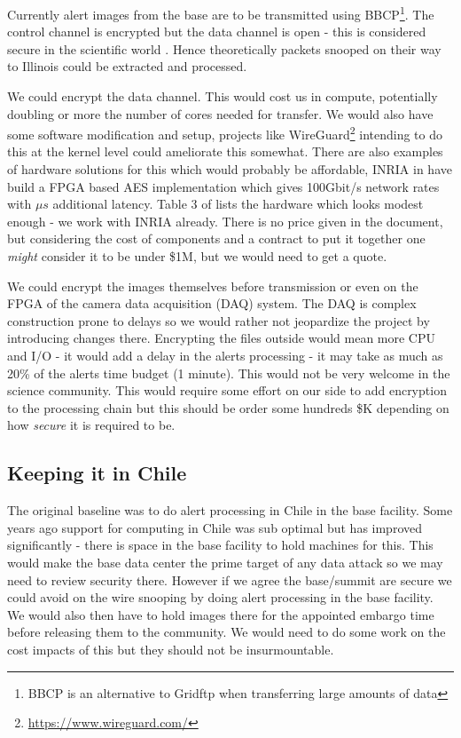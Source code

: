 Currently alert images from the base are to be transmitted using BBCP\footnote{BBCP is an alternative to Gridftp when transferring large amounts of data}. The control channel is encrypted but the data channel is open - this is considered secure in the scientific world \citep{bbcp}. Hence theoretically packets snooped on their way to Illinois could be extracted and processed.


We could encrypt the data  channel. This would cost us in  compute, potentially  doubling or more the number of cores needed for transfer. We would also have some software modification and setup, projects like WireGuard\footnote{\url{https://www.wireguard.com/}} intending to do this at the kernel level could ameliorate this somewhat.
There are also  examples of hardware solutions for this which would probably be affordable, INRIA in \cite{10.1007/978-3-642-45073-0_1} have build a FPGA based AES\cite{aes} implementation  which gives 100Gbit/s network rates with $\mu s$ additional latency. Table 3 of \cite{10.1007/978-3-642-45073-0_1} lists the hardware which looks modest enough - we work with INRIA already. There is no price given in the document, but considering the cost of components and a contract to put it together one \emph{might} consider it to be  under \$1M, but we would need to get a quote.

We could encrypt the images themselves before transmission or even on the FPGA of the camera data acquisition (DAQ) system.  The DAQ is complex construction prone to delays so we would rather not jeopardize the project by introducing changes there. Encrypting the files outside would mean more CPU and I/O - it would add a delay in the alerts processing - it may take as much as 20\% of the alerts time budget (1 minute).  This would not be very welcome in the science community. This would require some effort on our side to add encryption to the processing chain but this should be order some hundreds \$K depending on how \emph{secure} it is required to be.



\subsection{Keeping it in Chile}\label{sec:chile}
The original baseline was to do alert processing in Chile in the base facility. Some years ago support for computing in Chile was sub optimal but has improved significantly - there is space in the base facility to hold machines for this.
This would make the base data center the prime target of any data  attack so we may need to review security there.
However if we agree the base/summit are secure we could avoid on the wire snooping by doing alert processing in the base facility. We would also then have to hold images there for the appointed embargo time  before releasing them to the community. We would need to do some work on the cost impacts of this but they should not be insurmountable.
